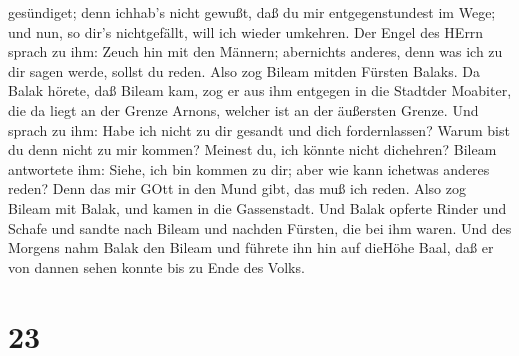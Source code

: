 gesündiget; denn ichhab's nicht gewußt, daß du mir entgegenstundest im
Wege; und nun, so dir's nichtgefällt, will ich wieder umkehren.
 Der Engel des HErrn sprach zu ihm: Zeuch hin mit den
Männern; abernichts anderes, denn was ich zu dir sagen werde, sollst du
reden. Also zog Bileam mitden Fürsten Balaks.  Da Balak
hörete, daß Bileam kam, zog er aus ihm entgegen in die Stadtder
Moabiter, die da liegt an der Grenze Arnons, welcher ist an der
äußersten Grenze.  Und sprach zu ihm: Habe ich nicht zu dir
gesandt und dich fordernlassen? Warum bist du denn nicht zu mir kommen?
Meinest du, ich könnte nicht dichehren?  Bileam antwortete
ihm: Siehe, ich bin kommen zu dir; aber wie kann ichetwas anderes reden?
Denn das mir GOtt in den Mund gibt, das muß ich reden. 
Also zog Bileam mit Balak, und kamen in die Gassenstadt. 
Und Balak opferte Rinder und Schafe und sandte nach Bileam und nachden
Fürsten, die bei ihm waren.  Und des Morgens nahm Balak den
Bileam und führete ihn hin auf dieHöhe Baal, daß er von dannen sehen
konnte bis zu Ende des Volks.

\hypertarget{section-22}{%
\section{23}\label{section-22}}

